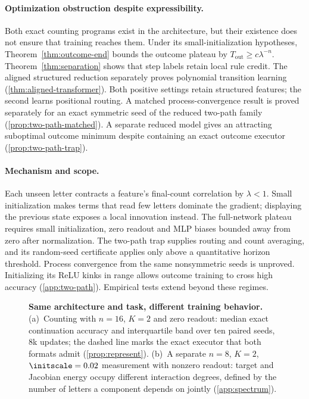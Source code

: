 \paragraph{Optimization obstruction despite expressibility.}
Both exact counting programs exist in the architecture, but their existence does
not ensure that training reaches them. Under its small-initialization hypotheses,
Theorem~\ref{thm:outcome-end} bounds the outcome plateau by
$T_{\mathrm{out}}\ge c\lambda^{-n}$. Theorem~\ref{thm:separation} shows that
step labels retain local rule credit. The aligned structured reduction separately
proves polynomial transition learning (\cref{thm:aligned-transformer}). Both positive
settings retain structured features; the second learns positional routing.
A matched process-convergence result is proved separately for an exact symmetric
seed of the reduced two-path family (\cref{prop:two-path-matched}).
A separate reduced model gives an attracting suboptimal outcome minimum despite
containing an exact outcome executor (\cref{prop:two-path-trap}).

\paragraph{Mechanism and scope.}
Each unseen letter contracts a feature's final-count correlation by $\lambda<1$.
Small initialization makes terms that read few letters dominate the gradient;
displaying the previous state exposes a local innovation instead.
The full-network plateau requires small initialization, zero readout and MLP
biases bounded away from zero after normalization. The two-path trap supplies
routing and count averaging, and its random-seed certificate applies only above a quantitative horizon
threshold. Process convergence from the same nonsymmetric seeds is unproved. Initializing its ReLU kinks in range allows outcome training
to cross high accuracy (\cref{app:two-path}). Empirical tests extend beyond these regimes.

\begin{figure}[t]
\centering

\caption{\textbf{Same architecture and task, different training behavior.}
(a)~Counting with $n=16$, $K=2$ and zero readout: median exact continuation accuracy and interquartile band over ten paired seeds, $8$k
updates; the dashed line marks the exact executor that both formats admit (\cref{prop:represent}).
(b)~A separate $n=8$, $K=2$, $\initscale=0.02$ measurement with nonzero readout: target and Jacobian energy occupy different interaction degrees, defined by the number of letters a component depends on jointly (\cref{app:spectrum}).}
\label{fig:overview}
\end{figure}

